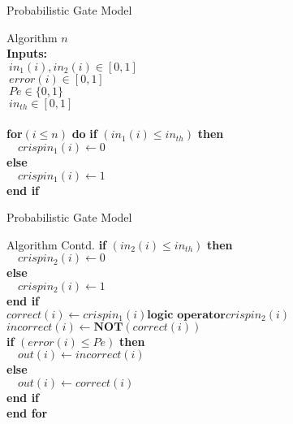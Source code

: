 \documentclass{beamer}
\begin{document}
\begin{frame}{Probabilistic Gate Model}
    \begin{block}{Algorithm}
    $n$ \leftarrow {}\\
    \textbf{Inputs:}\\
        $\: in_1 (i) , in_2 (i) \in [0,1] $ \leftarrow {}\\
        $\:error(i)\in [0,1]$ \leftarrow {}\\
        $\:Pe \in \{0,1\}$ \leftarrow {}\\
        $\:in_{th} \in [0,1]$ \leftarrow {}\\ \\
    \textbf{for}$(i \leq n)$ \textbf{do}
        \textbf{    if} $(in_1 (i) \leq in_{th})$ \textbf{then}\\
        $\quad crispin_1 (i) \leftarrow 0$\\
        \textbf{    else}\\
        $\quad crispin_1 (i) \leftarrow 1$\\
        \textbf{    end if}\\
    \end{block}
\end{frame}

\begin{frame}{Probabilistic Gate Model}
    \begin{block}{Algorithm Contd.}
 \textbf{    if} $(in_2 (i) \leq in_{th})$ \textbf{then}\\
        $\quad crispin_2 (i) \leftarrow 0$\\
        \textbf{    else}\\
        $\quad crispin_2 (i) \leftarrow 1$\\
        \textbf{    end if}\\
        $correct(i) \leftarrow crispin_1 (i) \textbf{logic operator} crispin_2 (i)$\\
        $incorrect(i) \leftarrow \textbf{NOT} (correct(i))$\\
        \textbf{    if} $(error (i) \leq Pe)$ \textbf{then}\\
        $\quad out(i) \leftarrow incorrect(i)$\\
        \textbf{    else}\\
        $\quad out(i) \leftarrow correct(i)$\\
        \textbf{    end if}\\
        \textbf{end for}\\
    \end{block}
\end{frame}
\end{document}
